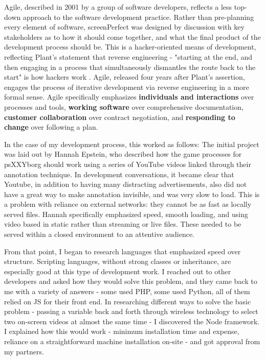 Agile, described in 2001 by a group of software developers, reflects a less top-down approach to the software development practice. Rather than pre-planning every element of software, screenPerfect was designed by discussion with key stakeholders as to how it should come together, and what the final product of the development process should be. This is a hacker-oriented means of development, reflecting Plant's statement that reverse engineering - "starting at the end, and then engaging in a process that simultaneously dismantles the route back to the start" is how hackers work \parencite{plant}. Agile, released four years after Plant's assertion, engages the process of iterative development via reverse engineering in a more formal sense. Agile specifically emphasizes \textbf{individuals and interactions} over processes and tools, \textbf{working software} over comprehensive documentation, \textbf{customer collaboration} over contract negotiation, and \textbf{responding to change} over following a plan. 

In the case of my development process, this worked as follows: The initial project was laid out by Hannah Epstein, who described how the game processes for psXXYborg should work using a series of YouTube videos linked through their annotation technique. In development conversations, it became clear that Youtube, in addition to having many distracting advertisements, also did not have a great way to make annotation invisible, and was very slow to load. This is a problem with reliance on external networks: they cannot be as fast as locally served files. Hannah specifically emphasized speed, smooth loading, and using video based in static rather than streaming or live files. These needed to be served within a closed environment to an attentive audience.

From that point, I began to research languages that emphasized speed over structure. Scripting languages, without strong classes or inheritance, are especially good at this type of development work. I reached out to other developers and asked how they would solve this problem, and they came back to me with a variety of answers - some used PHP, some used Python, all of them relied on JS for their front end. In researching different ways to solve the basic problem - passing a variable back and forth through wireless technology to select two on-screen videos at almost the same time - I discovered the Node framework. I explained how this would work - minimum installation time and expense, reliance on a straightforward machine installation on-site - and got approval from my partners.

